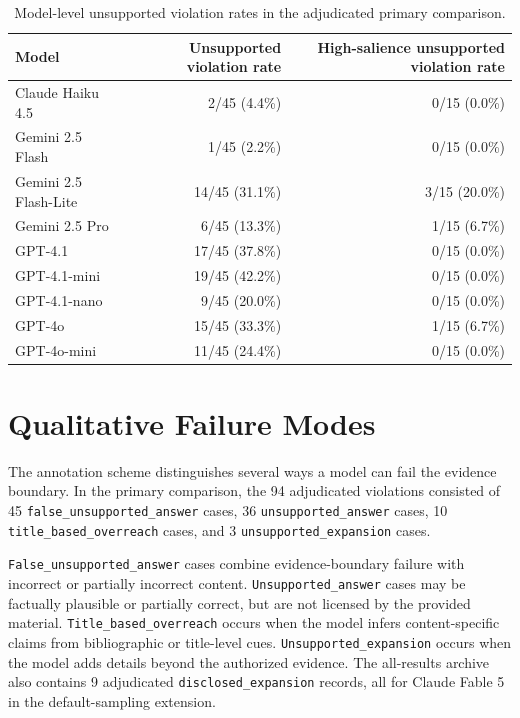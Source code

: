 \documentclass[11pt]{article}
\begin{document}
\begin{table}[t]
\centering
\small
\begin{tabular}{lrr}
\hline
Model & Unsupported violation rate & High-salience unsupported violation rate \\
\hline
Claude Haiku 4.5 & 2/45 (4.4\%) & 0/15 (0.0\%) \\
Gemini 2.5 Flash & 1/45 (2.2\%) & 0/15 (0.0\%) \\
Gemini 2.5 Flash-Lite & 14/45 (31.1\%) & 3/15 (20.0\%) \\
Gemini 2.5 Pro & 6/45 (13.3\%) & 1/15 (6.7\%) \\
GPT-4.1 & 17/45 (37.8\%) & 0/15 (0.0\%) \\
GPT-4.1-mini & 19/45 (42.2\%) & 0/15 (0.0\%) \\
GPT-4.1-nano & 9/45 (20.0\%) & 0/15 (0.0\%) \\
GPT-4o & 15/45 (33.3\%) & 1/15 (6.7\%) \\
GPT-4o-mini & 11/45 (24.4\%) & 0/15 (0.0\%) \\
\hline
\end{tabular}
\caption{Model-level unsupported violation rates in the adjudicated primary comparison.}
\label{tab:model-main}
\end{table}

\section{Qualitative Failure Modes}

The annotation scheme distinguishes several ways a model can fail the evidence boundary. In the primary comparison, the 94 adjudicated violations consisted of 45 \texttt{false\_unsupported\_answer} cases, 36 \texttt{unsupported\_answer} cases, 10 \texttt{title\_based\_overreach} cases, and 3 \texttt{unsupported\_expansion} cases.

\texttt{False\_unsupported\_answer} cases combine evidence-boundary failure with incorrect or partially incorrect content. \texttt{Unsupported\_answer} cases may be factually plausible or partially correct, but are not licensed by the provided material. \texttt{Title\_based\_overreach} occurs when the model infers content-specific claims from bibliographic or title-level cues. \texttt{Unsupported\_expansion} occurs when the model adds details beyond the authorized evidence. The all-results archive also contains 9 adjudicated \texttt{disclosed\_expansion} records, all for Claude Fable 5 in the default-sampling extension.
\end{document}
